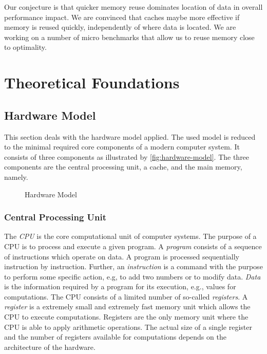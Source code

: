 \documentclass[onecolumn, openany, master, english, seal, signatures]{dbrgrptt}
\begin{document}
Our conjecture is that quicker memory reuse dominates location of data in overall performance impact. We are convinced that caches maybe more effective if memory is reused quickly, independently of where data is located. We are  working on a number of micro benchmarks that allow us to reuse memory close to optimality.


\chapter{Theoretical Foundations}\label{cha:theoretical-foundations}

\section{Hardware Model}\label{sec:hardware-model}

This section deals with the hardware model applied. The used model is reduced to the minimal required core components of a modern computer system. It consists of three components as illustrated by \autoref{fig:hardware-model}. The three components are the central processing unit, a cache, and the main memory, namely.

\begin{figure}[h!]
  \centering
  
  \caption{Hardware Model}
  \label{fig:hardware-model}
\end{figure}

\subsection{Central Processing Unit}
The \emph{\ac{CPU}} is the core computational unit of computer systems. The purpose of a \ac{CPU} is to process and execute a given program. A \emph{program} consists of a sequence of instructions which operate on data. A program is processed sequentially instruction by instruction. Further, an \emph{instruction} is a command with the purpose to perform some specific action, e.g, to add two numbers or to modify data. \emph{Data} is the information required by a program for its execution, e.g., values for computations. The \ac{CPU} consists of a limited number of so-called \emph{registers}. A \emph{register} is a extremely small and extremely fast memory unit which allows the \ac{CPU} to execute computations. Registers are the only memory unit where the \ac{CPU} is able to apply arithmetic operations. The actual size of a single register and the number of registers available for computations depends on the architecture of the hardware.
\end{document}
